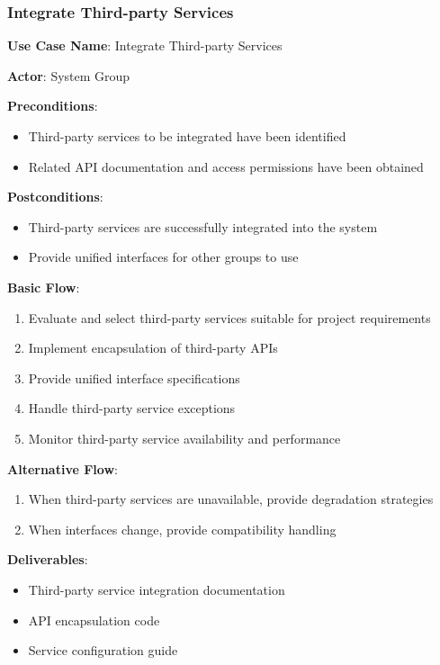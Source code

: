 \documentclass[a4paper,12pt]{article}
\begin{document}
\subsubsection{Integrate Third-party Services}

\textbf{Use Case Name}: Integrate Third-party Services

\textbf{Actor}: System Group

\textbf{Preconditions}:
\begin{itemize}
  \item Third-party services to be integrated have been identified
  \item Related API documentation and access permissions have been obtained
\end{itemize}

\textbf{Postconditions}:
\begin{itemize}
  \item Third-party services are successfully integrated into the system
  \item Provide unified interfaces for other groups to use
\end{itemize}

\textbf{Basic Flow}:
\begin{enumerate}
  \item Evaluate and select third-party services suitable for project requirements
  \item Implement encapsulation of third-party APIs
  \item Provide unified interface specifications
  \item Handle third-party service exceptions
  \item Monitor third-party service availability and performance
\end{enumerate}

\textbf{Alternative Flow}:
\begin{enumerate}
  \item When third-party services are unavailable, provide degradation strategies
  \item When interfaces change, provide compatibility handling
\end{enumerate}

\textbf{Deliverables}:
\begin{itemize}
  \item Third-party service integration documentation
  \item API encapsulation code
  \item Service configuration guide
\end{itemize}
\end{document}
